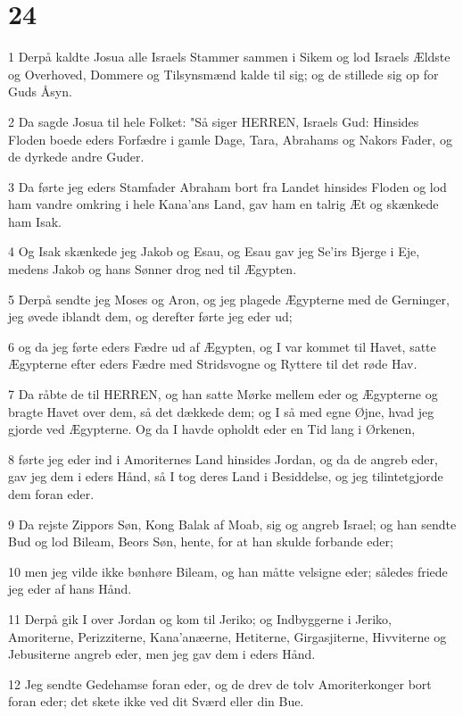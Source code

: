 \chapter{24}

\par 1 Derpå kaldte Josua alle Israels Stammer sammen i Sikem og lod Israels Ældste og Overhoved, Dommere og Tilsynsmænd kalde til sig; og de stillede sig op for Guds Åsyn.
\par 2 Da sagde Josua til hele Folket: "Så siger HERREN, Israels Gud: Hinsides Floden boede eders Forfædre i gamle Dage, Tara, Abrahams og Nakors Fader, og de dyrkede andre Guder.
\par 3 Da førte jeg eders Stamfader Abraham bort fra Landet hinsides Floden og lod ham vandre omkring i hele Kana'ans Land, gav ham en talrig Æt og skænkede ham Isak.
\par 4 Og Isak skænkede jeg Jakob og Esau, og Esau gav jeg Se'irs Bjerge i Eje, medens Jakob og hans Sønner drog ned til Ægypten.
\par 5 Derpå sendte jeg Moses og Aron, og jeg plagede Ægypterne med de Gerninger, jeg øvede iblandt dem, og derefter førte jeg eder ud;
\par 6 og da jeg førte eders Fædre ud af Ægypten, og I var kommet til Havet, satte Ægypterne efter eders Fædre med Stridsvogne og Ryttere til det røde Hav.
\par 7 Da råbte de til HERREN, og han satte Mørke mellem eder og Ægypterne og bragte Havet over dem, så det dækkede dem; og I så med egne Øjne, hvad jeg gjorde ved Ægypterne. Og da I havde opholdt eder en Tid lang i Ørkenen,
\par 8 førte jeg eder ind i Amoriternes Land hinsides Jordan, og da de angreb eder, gav jeg dem i eders Hånd, så I tog deres Land i Besiddelse, og jeg tilintetgjorde dem foran eder.
\par 9 Da rejste Zippors Søn, Kong Balak af Moab, sig og angreb Israel; og han sendte Bud og lod Bileam, Beors Søn, hente, for at han skulde forbande eder;
\par 10 men jeg vilde ikke bønhøre Bileam, og han måtte velsigne eder; således friede jeg eder af hans Hånd.
\par 11 Derpå gik I over Jordan og kom til Jeriko; og Indbyggerne i Jeriko, Amoriterne, Perizziterne, Kana'anæerne, Hetiterne, Girgasjiterne, Hivviterne og Jebusiterne angreb eder, men jeg gav dem i eders Hånd.
\par 12 Jeg sendte Gedehamse foran eder, og de drev de tolv Amoriterkonger bort foran eder; det skete ikke ved dit Sværd eller din Bue.
